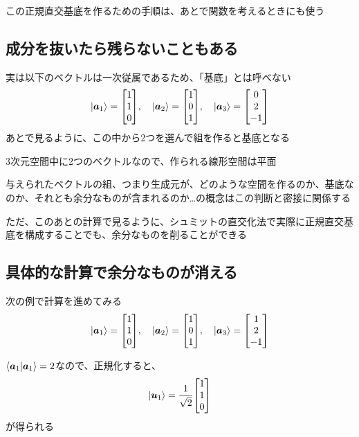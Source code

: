 \documentclass[../book_half_step_linear]{subfiles}
\begin{document}
この正規直交基底を作るための手順は、あとで関数を考えるときにも使う

\sectionline
\subsection{成分を抜いたら残らないこともある}

実は以下のベクトルは一次従属であるため、「基底」とは呼べない
\begin{equation*}
  \ket{\vb*{a}_1} = \mqty[1 \\ 1 \\ 0], \quad \ket{\vb*{a}_2} = \mqty[1 \\ 0 \\ 1], \quad \ket{\vb*{a}_3} = \mqty[0 \\ 2 \\ -1]
\end{equation*}
あとで見るように、この中から2つを選んで組を作ると基底となる

3次元空間中に2つのベクトルなので、作られる線形空間は平面

\br

与えられたベクトルの組、つまり生成元が、どのような空間を作るのか、基底なのか、それとも余分なものが含まれるのか…の概念はこの判断と密接に関係する

ただ、このあとの計算で見るように、シュミットの直交化法で実際に正規直交基底を構成することでも、余分なものを削ることができる

\sectionline
\subsection{具体的な計算で余分なものが消える}

次の例で計算を進めてみる
\begin{equation*}
  \ket{\vb*{a}_1} = \mqty[1 \\ 1 \\ 0], \quad \ket{\vb*{a}_2} = \mqty[1 \\ 0 \\ 1], \quad \ket{\vb*{a}_3} = \mqty[1 \\ 2 \\ -1]
\end{equation*}

$\braket{\vb*{a}_1|\vb*{a}_1} = 2$なので、正規化すると、
\begin{equation*}
  \ket{\vb*{u}_1} = \frac{1}{\sqrt{2}} \mqty[1 \\ 1 \\ 0]
\end{equation*}
が得られる
\end{document}
